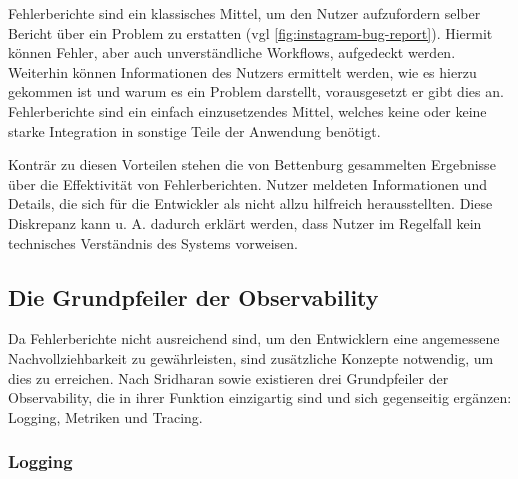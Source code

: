 Fehlerberichte sind ein klassisches Mittel, um den Nutzer aufzufordern selber Bericht über ein Problem zu erstatten (vgl \autoref{fig:instagram-bug-report}). Hiermit können Fehler, aber auch unverständliche Workflows, aufgedeckt werden. Weiterhin können Informationen des Nutzers ermittelt werden, wie es hierzu gekommen ist und warum es ein Problem darstellt, vorausgesetzt er gibt dies an. Fehlerberichte sind ein einfach einzusetzendes Mittel, welches keine oder keine starke Integration in sonstige Teile der Anwendung benötigt.

Konträr zu diesen Vorteilen stehen die von Bettenburg \etal \cite{WhatMakesAGoodBugReport} gesammelten Ergebnisse über die Effektivität von Fehlerberichten. Nutzer meldeten Informationen und Details, die sich für die Entwickler als nicht allzu hilfreich herausstellten. Diese Diskrepanz kann u. A. dadurch erklärt werden, dass Nutzer im Regelfall kein technisches Verständnis des Systems vorweisen.

\subsection{Die Grundpfeiler der Observability}

Da Fehlerberichte nicht ausreichend sind, um den Entwicklern eine angemessene Nachvollziehbarkeit zu gewährleisten, sind zusätzliche Konzepte notwendig, um dies zu erreichen. Nach Sridharan \etal \cite{DistributedSystemsObservability} sowie \cite{TraefikLogsRequestTracingAndMetrics} \cite{IntrospectiveOfTheCloudManagementToolbox} \cite{MultilevelObservabilityInCloudOrchestration} existieren drei Grundpfeiler der Observability, die in ihrer Funktion einzigartig sind und sich gegenseitig ergänzen: Logging, Metriken und Tracing.

\subsubsection{Logging}


